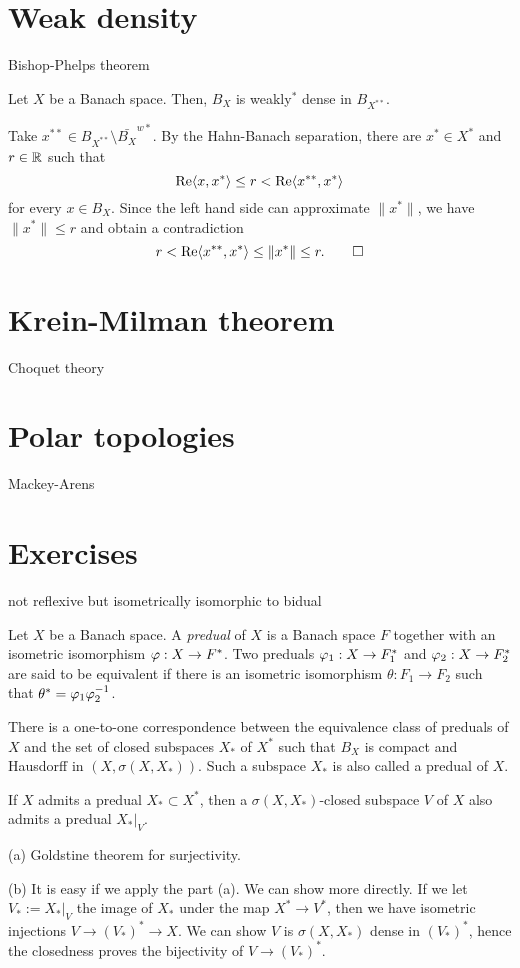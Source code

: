 \documentclass{../../large}
\begin{document}
\section{Weak density}
Bishop-Phelps theorem

\begin{prb}
Let $X$ be a Banach space.
Then, $B_X$ is weakly$^*$ dense in $B_{X^{**}}$.
\end{prb}
\begin{pf}
Take $x^{**}\in B_{X^{**}}\setminus\bar{B_X}^{w*}$.
By the Hahn-Banach separation, there are $x^*\in X^*$ and $r\in\mathbb{R}$ such that
\[\operatorname{Re}\langle x,x^*\rangle\le r<\operatorname{Re}\langle x^{**},x^*\rangle\]
for every $x\in B_X$.
Since the left hand side can approximate $\|x^*\|$, we have $\|x^*\|\le r$ and obtain a contradiction
\[r<\operatorname{Re}\langle x^{**},x^*\rangle\le\|x^*\|\le r.\qedhere\]
\end{pf}




\section{Krein-Milman theorem}
Choquet theory


\section{Polar topologies}
Mackey-Arens


\section*{Exercises}
\begin{prb}
not reflexive but isometrically isomorphic to bidual
\end{prb}

\begin{prb}[Preduals]
Let $X$ be a Banach space.
A \emph{predual} of $X$ is a Banach space $F$ together with an isometric isomorphism $\varphi:X\to F^*$.
Two preduals $\varphi_1:X\to F_1^*$ and $\varphi_2:X\to F_2^*$ are said to be equivalent if there is an isometric isomorphism $\theta:F_1\to F_2$ such that $\theta^*=\varphi_1\varphi_2^{-1}$.
\begin{parts}
\item There is a one-to-one correspondence between the equivalence class of preduals of $X$ and the set of closed subspaces $X_*$ of $X^*$ such that $B_X$ is compact and Hausdorff in $(X,\sigma(X,X_*))$.
Such a subspace $X_*$ is also called a predual of $X$.
\item If $X$ admits a predual $X_*\subset X^*$, then a $\sigma(X,X_*)$-closed subspace $V$ of $X$ also admits a predual $X_*|_V$.
\end{parts}
\end{prb}
\begin{pf}
(a) Goldstine theorem for surjectivity.

(b)
It is easy if we apply the part (a).
We can show more directly.
If we let $V_*:=X_*|_V$ the image of $X_*$ under the map $X^*\to V^*$, then we have isometric injections $V\to(V_*)^*\to X$.
We can show $V$ is $\sigma(X,X_*)$ dense in $(V_*)^*$, hence the closedness proves the bijectivity of $V\to(V_*)^*$.
\end{pf}
\end{document}
